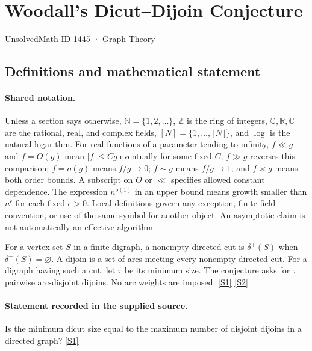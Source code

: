 \documentclass[11pt,a4paper]{article}
\newcommand{\N}{\mathbb{N}}
\newcommand{\Z}{\mathbb{Z}}
\newcommand{\Q}{\mathbb{Q}}
\newcommand{\R}{\mathbb{R}}
\newcommand{\C}{\mathbb{C}}
\newcommand{\sref}[2]{\hyperlink{source:#1:#2}{[S#2]}}
\begin{document}

\setcounter{section}{1444}

\section{Woodall’s Dicut--Dijoin Conjecture}\label{1445}

{\small\sffamily UnsolvedMath ID 1445 · Graph Theory}

\subsection{Definitions and mathematical statement}

\paragraph{Shared notation.}Unless a section says otherwise, $\N=\{1,2,\ldots\}$,
$\Z$ is the ring of integers, $\Q,\R,\C$ are the rational, real, and complex
fields, $[N]=\{1,\ldots,\lfloor N\rfloor\}$, and $\log$ is the natural
logarithm. For real functions of a parameter tending to infinity,
$f\ll g$ and $f=O(g)$ mean $|f|\leq Cg$ eventually for some fixed $C$;
$f\gg g$ reverses this comparison; $f=o(g)$ means $f/g\to0$;
$f\sim g$ means $f/g\to1$; and $f\asymp g$ means both order bounds.
A subscript on $O$ or $\ll$ specifies allowed constant dependence.
The expression $n^{o(1)}$ in an upper bound means growth smaller than
$n^\epsilon$ for each fixed $\epsilon>0$. Local definitions govern any
exception, finite-field convention, or use of the same symbol for another
object. An asymptotic claim is not automatically an effective algorithm.



For a vertex set $S$ in a finite digraph, a nonempty directed cut is $\delta^+(S)$ when $\delta^-(S)=\varnothing$. A dijoin is a set of arcs meeting every nonempty directed cut. For a digraph having such a cut, let $\tau$ be its minimum size. The conjecture asks for $\tau$ pairwise arc-disjoint dijoins. No arc weights are imposed. \sref{1445}{1} \sref{1445}{2}

\paragraph{Statement recorded in the supplied source.}
Is the minimum dicut size equal to the maximum number of disjoint dijoins in a directed graph? \sref{1445}{1}
\end{document}
